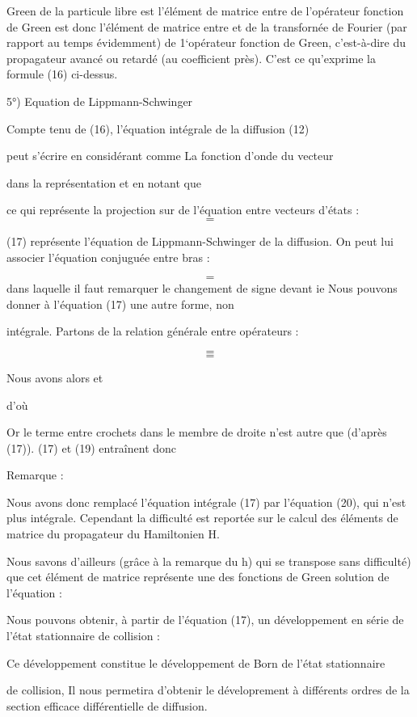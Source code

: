 %
Green de la particule libre est l'élément de matrice entre 
de l'opérateur fonction de Green  est donc l'élément de matrice entre  et de la
transfornée de Fourier (par rapport au
temps évidemment) de 1‘opérateur fonction de Green, c'est-à-dire du propagateur
avancé ou retardé (au coefficient  près). C'est ce qu'exprime
la formule (16) ci-dessus.

5°) Equation de Lippmann-Schwinger

Compte tenu de (16), l'équation intégrale de la diffusion (12)

peut s'écrire en considérant  comme La fonction d'onde du vecteur

 dans la représentation  et en notant que

ce qui représente la projection sur  de l'équation entre vecteurs
d'états :
\[
\tag{17}=
\]

(17) représente l'équation de Lippmann-Schwinger de la diffusion.
On peut lui associer l'équation conjuguée entre bras :

\[
\tag{18}=
\]
dans laquelle il faut remarquer le changement de signe devant ie
Nous pouvons donner à l'équation (17) une autre forme, non

intégrale. Partons de la relation générale entre opérateurs :

\[
\tag{19}=
\]
\[
\tag{20}=
\]


Nous avons alors  et

d'où

Or le terme entre crochets dans le membre de droite n'est autre que
(d'après (17)).
(17) et (19) entraînent donc

Remarque :

Nous avons donc remplacé l'équation intégrale (17) par l'équation (20),
qui n'est plus intégrale. Cependant la difficulté est reportée sur le calcul des
éléments de matrice  du propagateur
 du Hamiltonien H.


Nous savons d'ailleurs (grâce à la remarque du h) qui se transpose sans difficulté)
que cet élément de matrice représente une des fonctions
de Green solution de l'équation :

Nous pouvons obtenir, à partir de l'équation (17), un développement en série de
l'état stationnaire de collision :

Ce développement constitue le développement de Born de l'état stationnaire

de collision, Il nous permetira d'obtenir le déveloprement à différents
ordres de la section efficace différentielle de diffusion.

